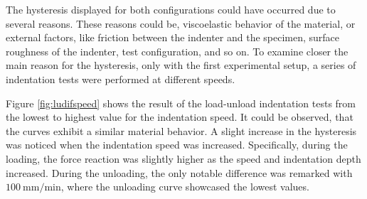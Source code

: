 The hysteresis displayed for both configurations could have occurred due to several reasons. These reasons could be, 
viscoelastic behavior of the material, or external factors, like friction 
between the indenter and the specimen, surface roughness of the indenter, test configuration, and so on.
To examine closer the main reason for the hysteresis, only with the first experimental setup,
a series of indentation tests were performed at different speeds.

Figure \ref{fig:ludifspeed} shows the result of the load-unload indentation tests from the lowest to 
highest value for the indentation speed. It could be observed, 
that the curves exhibit a similar material behavior. A slight 
increase in the hysteresis was noticed when the indentation 
speed was increased. Specifically, during the loading, the 
force reaction was slightly higher as the speed and indentation depth increased.
During the unloading, the only notable difference was remarked with 
$\SI[per-mode = symbol]{100}{\milli \m\per \minute}$, where the unloading curve
showcased the lowest values.\\

